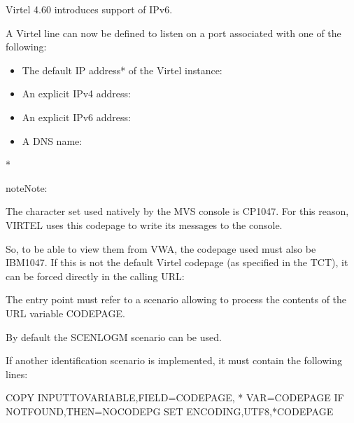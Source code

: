 \documentclass[letterpaper,10pt,english]{sphinxmanual}
\begin{document}
Virtel 4.60 introduces support of IPv6.

A Virtel line can now be defined to listen on a port associated with one of the following:
\begin{itemize}
\item {} 
The default IP address* of the Virtel instance: 

\item {} 
An explicit IPv4 address: 

\item {} 
An explicit IPv6 address: 

\item {} 
A DNS name: 

\end{itemize}

* 

\begin{sphinxadmonition}{note}{Note:}

The character set used natively by the MVS console is CP1047. For this reason, VIRTEL uses this codepage to write its messages to the console.

So, to be able to view them from VWA, the codepage used must also be IBM1047. If this is not the default Virtel codepage (as specified in the TCT), it can be forced directly in the calling URL: 

The entry point must refer to a scenario allowing to process the contents of the URL variable CODEPAGE.

By default the SCENLOGM scenario can be used.

If another identification scenario is implemented, it must contain the following lines:

\begin{sphinxVerbatim}[commandchars=\\\{\}]
COPY\PYGZdl{} INPUT\PYGZhy{}TO\PYGZhy{}VARIABLE,FIELD=\PYGZsq{}CODEPAGE\PYGZsq{},             *
      VAR=\PYGZsq{}CODEPAGE\PYGZsq{}
IF\PYGZdl{} NOT\PYGZhy{}FOUND,THEN=NOCODEPG
SET\PYGZdl{}  ENCODING,UTF\PYGZhy{}8,\PYGZsq{}*CODEPAGE\PYGZsq{}
\end{sphinxVerbatim}
\end{sphinxadmonition}
\end{document}
